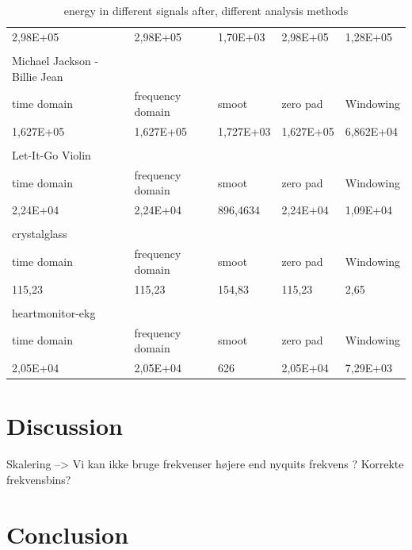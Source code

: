 \begin{table}[]
\begin{tabularx}{\textwidth}{Xllll}
		2,98E+05                      & 2,98E+05         & 1,70E+03  & 2,98E+05  & 1,28E+05  \\
		                              &                  &           &           &           \\
		Michael Jackson - Billie Jean &                  &           &           &           \\
		time domain                   & frequency domain & smoot     & zero pad  & Windowing \\
		1,627E+05                     & 1,627E+05        & 1,727E+03 & 1,627E+05 & 6,862E+04 \\
		                              &                  &           &           &           \\
		Let-It-Go Violin              &                  &           &           &           \\
		time domain                   & frequency domain & smoot     & zero pad  & Windowing \\
		2,24E+04                      & 2,24E+04         & 896,4634  & 2,24E+04  & 1,09E+04  \\
		                              &                  &           &           &           \\
		crystalglass                  &                  &           &           &           \\
		time domain                   & frequency domain & smoot     & zero pad  & Windowing \\
		115,23                        & 115,23           & 154,83    & 115,23    & 2,65      \\
		                              &                  &           &           &           \\
		heartmonitor-ekg              &                  &           &           &           \\
		time domain                   & frequency domain & smoot     & zero pad  & Windowing \\
		2,05E+04                      & 2,05E+04         & 626       & 2,05E+04  & 7,29E+03 
	\end{tabularx}
	
	\caption{energy in different signals after, different analysis methods }
	\label{tab:Energy}
\end{table}

\section{Discussion}

Skalering --> Vi kan ikke bruge frekvenser højere end nyquits frekvens ?
Korrekte frekvensbins?

\section{Conclusion}